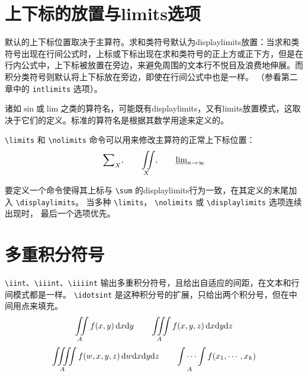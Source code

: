 \section{上下标的放置与limits选项\label{sec7.3}}
默认的上下标位置取决于主算符。求和类符号默认为displaylimits放置：当求和类符号出现在行间公式时，上标或下标出现在求和类符号的正上方或正下方，但是在行内公式中，上下标被放置在旁边，来避免周围的文本行不悦目及浪费地伸展。而积分类符号则默认将上下标放在旁边，即使在行间公式中也是一样。 （参看第二章中的 \verb|intlimits| 选项）。

诸如$\sin$或$\lim$之类的算符名，可能既有displaylimits，又有limits放置模式，这取决于它们的定义。标准的算符名是根据其数学用途来定义的。

\verb|\limits| 和 \verb|\nolimits| 命令可以用来修改主算符的正常上下标位置：
\[\sum\nolimits_X,\qquad\iint\limits_X,\qquad\varliminf\nolimits_{n\to\infty}\]

要定义一个命令使得其上标与 \verb|\sum| 的displaylimits行为一致，在其定义的末尾加入 \verb|\displaylimits|。 当多种 \verb|\limits|，  \verb|\nolimits| 或 \verb|\displaylimits| 选项连续出现时，  最后一个选项优先。
\section{多重积分符号}
\verb|\iint|、\verb|\iiint|、\verb|\iiiint| 输出多重积分符号，且给出自适应的间距，在文本和行间模式都是一样。 \verb|\idotsint| 是这种积分号的扩展，只给出两个积分号，但在中间用点来填充。
\begin{equation}
\iint\limits_Af(x,y)\,\text dx\text dy\qquad\iiint\limits_Af(x,y,z)\,\text dx\text dy\text d z
\end{equation}
\begin{equation}
\iiiint\limits_Af(w,x,y,z)\,\text dw\text dx\text dy\text dz\qquad\idotsint\limits_Af(x_1,\cdots,x_k)
\end{equation}
